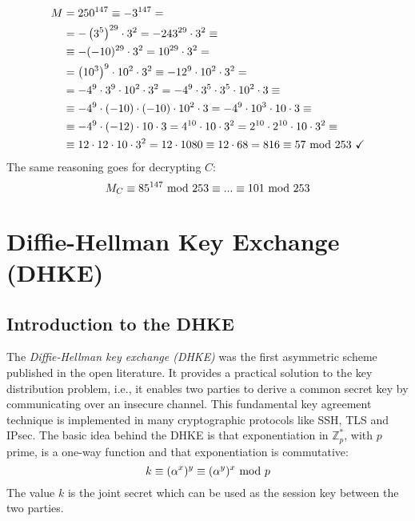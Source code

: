 \begin{align*}
    M&=250^{147}\equiv-3^{147}=\\
    &=-\left(3^5\right)^{29}\cdot3^2=-243^{29}\cdot3^2\equiv\\
    &\equiv-(-10)^{29}\cdot3^2=10^{29}\cdot3^2=\\
    &=\left(10^3\right)^9\cdot10^2\cdot3^2\equiv-12^9\cdot10^2\cdot3^2=\\
    &=-4^9\cdot3^9\cdot10^2\cdot3^2=-4^9\cdot3^5\cdot3^5\cdot10^2\cdot3\equiv\\
    &\equiv-4^9\cdot(-10)\cdot(-10)\cdot10^2\cdot3=-4^9\cdot10^3\cdot10\cdot3\equiv\\
    &\equiv-4^9\cdot(-12)\cdot10\cdot3=4^{10}\cdot10\cdot3^2=2^{10}\cdot2^{10}\cdot10\cdot3^2\equiv\\
    &\equiv12\cdot12\cdot10\cdot3^2=12\cdot1080\equiv12\cdot68=816\equiv57\text{ mod }253\text{ \checkmark}
\end{align*}
The same reasoning goes for decrypting $C$:
$$M_C\equiv85^{147}\text{ mod }253\equiv...\equiv101\text{ mod }253$$

\newpage
\section{Diffie-Hellman Key Exchange (DHKE)}
\subsection{Introduction to the DHKE}
The \textit{Diffie-Hellman key exchange (DHKE)} was the first asymmetric scheme published in the open literature. It provides a practical solution to the key distribution problem, i.e., it enables two parties to derive a common secret key by communicating over an insecure channel. This fundamental key agreement technique is implemented in many cryptographic protocols like SSH, TLS and IPsec. The basic idea behind the DHKE is that exponentiation in $\mathbb{Z}_p^*$, with $p$ prime, is a one-way function and that exponentiation is commutative:
$$k\equiv(\alpha^x)^y\equiv(\alpha^y)^x\text{ mod } p$$
The value $k$ is the joint secret which can be used as the session key between the two parties.

